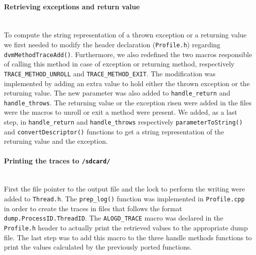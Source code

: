 \paragraph{Retrieving exceptions and return value} ~\\
To compute the string representation of a thrown exception or a
returning value we first needed to modify the header declaration
(\texttt{Profile.h}) regarding
\texttt{dvmMethodTraceAdd()}. Furthermore, we also redefined the two
macros responsible of calling this method in case of exception or
returning method, respectively \texttt{TRACE\_METHOD\_UNROLL} and
\texttt{TRACE\_METHOD\_EXIT}. The modification was implemented by
adding an extra value to hold either the thrown exception or the
returning value. The new parameter was also added to
\texttt{handle\_return} and \texttt{handle\_throws}. The returning
value or the exception risen were added in the files were the macros
to unroll or exit a method were present. We added, as a last step, in
\texttt{handle\_return} and \texttt{handle\_throws} respectively
\texttt{parameterToString()} and \texttt{convertDescriptor()}
functions to get a string representation of the returning value and
the exception.

\paragraph{Printing the traces to \texttt{/sdcard/}} ~\\
First the file pointer to the output file and the lock to perform the
writing were added to \texttt{Thread.h}. The \texttt{prep\_log()}
function was implemented in \texttt{Profile.cpp} in order to create
the traces in files that follows the format
\texttt{dump.ProcessID.ThreadID}. The \texttt{ALOGD\_TRACE} macro was
declared in the \texttt{Profile.h} header to actually print the
retrieved values to the appropriate dump file. The last step was to
add this macro to the three handle methods functions to print the
values calculated by the previously ported functions.
